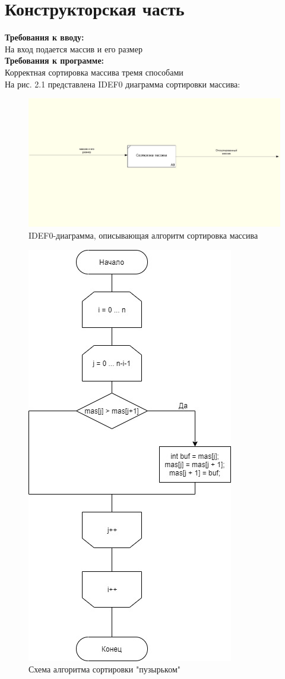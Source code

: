 \documentclass[12pt]{report}
\begin{document}
\chapter{Конструкторская часть}
\textbf{Требования к вводу:}\\
На вход подается массив и его размер\\
\textbf{Требования к программе:}\\
Корректная сортировка массива тремя способами \\

На рис. 2.1 представлена IDEF0 диаграмма сортировки массива:

\begin{figure}[h]
\centering
\includegraphics[width=1\linewidth]{idef.jpg}
\caption{IDEF0-диаграмма, описывающая алгоритм сортировка массива}
\label{fig:mpr}
\end{figure}




\begin{figure}[!ht]
\centering
\includegraphics[width=0.6\linewidth]{diag_bubble.jpg}
\caption{Схема алгоритма сортировки "пузырьком"}
\label{fig:mpr}
\end{figure}
\end{document}
